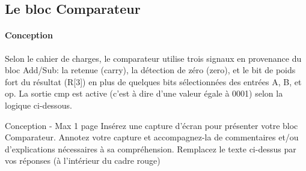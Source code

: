 \documentclass[a4paper]{article}
\begin{document}
\subsection{Le bloc Comparateur}
\label{comp}
\paragraph{Conception} Selon le cahier de charges, le comparateur utilise trois signaux en provenance du bloc Add/Sub: la retenue (carry), la détection de zéro (zero), et le bit de poids fort du résultat (R[3]) en plus de quelques bits sélectionnées des entrées A, B, et op. La sortie cmp est active (c’est à dire d’une valeur égale à 0001) selon la logique ci-dessous.

\begin{tcolorbox}[colframe=Monokaimagenta,colback=white]
Conception - Max 1 page 
Insérez une capture d’écran pour présenter votre bloc Comparateur. 
Annotez votre capture et accompagnez-la de commentaires et/ou d’explications nécessaires à sa compréhension.
Remplacez le texte ci-dessus par vos réponses (à l’intérieur du cadre rouge)
\end{tcolorbox}
\end{document}
